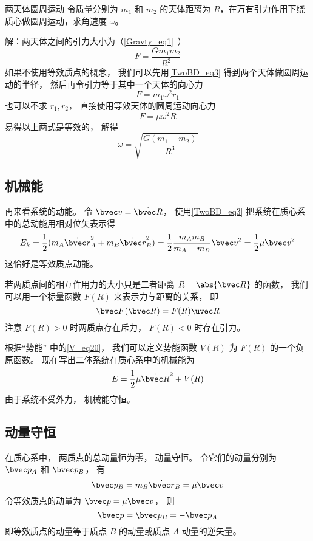 \begin{example}{两天体圆周运动}
令质量分别为 $m_1$ 和 $m_2$ 的天体距离为 $R$，在万有引力作用下绕质心做圆周运动，求角速度 $\omega$。

解：两天体之间的引力大小为（\autoref{Gravty_eq1}~）
\begin{equation}
F = \frac{Gm_1m_2}{R^2}
\end{equation}
如果不使用等效质点的概念， 我们可以先用\autoref{TwoBD_eq3} 得到两个天体做圆周运动的半径， 然后再令引力等于其中一个天体的向心力
\begin{equation}
F = m_1 \omega^2 r_1
\end{equation}
也可以不求 $r_1, r_2$， 直接使用等效天体的圆周运动向心力
\begin{equation}
F = \mu \omega^2 R
\end{equation}
易得以上两式是等效的， 解得
\begin{equation}
\omega = \sqrt{\frac{G(m_1 + m_2)}{R^3}}
\end{equation}
\end{example}

\subsection{机械能}

再来看系统的动能。 令 $\bvec v = \dot {\bvec R}$， 使用\autoref{TwoBD_eq3} 把系统在质心系中的总动能用相对位矢表示得
\begin{equation}
E_k = \frac12 (m_A \dot{\bvec r}_A^2 + m_B \dot{\bvec r}_B^2) = \frac12 \frac{m_A m_B}{m_A + m_B} {\bvec  v}^2 = \frac12 \mu {\bvec  v}^2
\end{equation}
这恰好是等效质点动能。

若两质点间的相互作用力的大小只是二者距离 $R = \abs{\bvec R}$ 的函数， 我们可以用一个标量函数 $F(R)$ 来表示力与距离的关系， 即
\begin{equation}
\bvec F(\bvec R) = F(R) \uvec R
\end{equation}
注意 $F(R)>0$ 时两质点存在斥力， $F(R)<0$ 时存在引力。

根据“势能” 中的\autoref{V_eq20}， 我们可以定义势能函数 $V(R)$ 为 $F(R)$ 的一个负原函数。 现在写出二体系统在质心系中的机械能为
\begin{equation}
E = \frac12 \mu \dot{\bvec  R}^2 + V(R)
\end{equation}
由于系统不受外力， 机械能守恒。

\subsection{动量守恒}
在质心系中， 两质点的总动量恒为零， 动量守恒。 令它们的动量分别为 $\bvec p_A$ 和 $\bvec p_B$， 有
\begin{equation}\label{TwoBD_eq10}
\bvec p_B = m_B \dot {\bvec r}_B = \mu \bvec v
\end{equation}
令等效质点的动量为 $\bvec p = \mu \bvec v$， 则
\begin{equation}\label{TwoBD_eq11}
\bvec p = \bvec p_B = -\bvec p_A
\end{equation}
即等效质点的动量等于质点 $B$ 的动量或质点 $A$ 动量的逆矢量。

